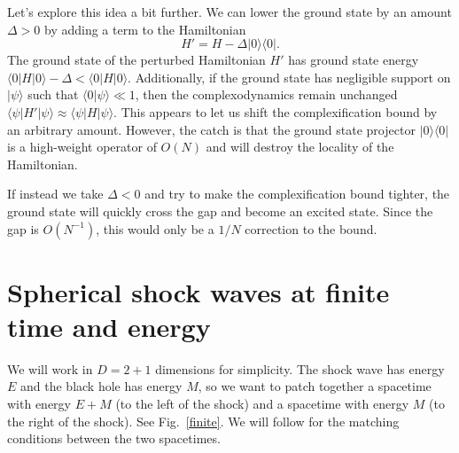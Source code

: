 \documentclass[12pt]{article}
\numberwithin{equation}{section}
\newcommand{\be}{\begin{equation}}
\newcommand{\ee}{\end{equation}}
\begin{document}
Let's explore this idea a bit further. We can lower the ground state by an amount $\Delta > 0$ by adding a term to the Hamiltonian
\be
H' = H - \Delta | 0 \rangle\langle 0 |.
\ee
The ground state of the perturbed Hamiltonian $H'$ has ground state energy $\langle 0 | H | 0 \rangle - \Delta < \langle 0 | H | 0 \rangle$. Additionally, if the ground state has negligible support on $|\psi\rangle$ such that $\langle 0 |\psi\rangle \ll 1$, then the complexodynamics remain unchanged $\langle \psi | H' | \psi\rangle \approx \langle \psi | H | \psi\rangle$. This appears to let us  shift the complexification bound by an arbitrary amount. However, the catch is that the ground state projector $| 0 \rangle\langle 0 |$ is a high-weight operator of $O(N)$ and will destroy the locality of the Hamiltonian.

If instead we take $\Delta < 0$ and try to make the complexification bound tighter, the ground state will quickly cross the gap and become an excited state. Since the gap is $O(N^{-1})$, this would only be a $1/N$ correction to the bound.


\section{Spherical shock waves at finite time and energy} \label{appendix-finite-time}

 We will work in $D=2+1$ dimensions for simplicity. The shock wave has energy $E$ and the black hole has energy $M$, so we want to patch together a spacetime with energy $E+M$ (to the left of the shock) and a spacetime with energy $M$ (to the right of the shock). See Fig.~\ref{finite}. We will follow \cite{Dray:1985yt,shock} for the matching conditions between the two spacetimes.
\end{document}
